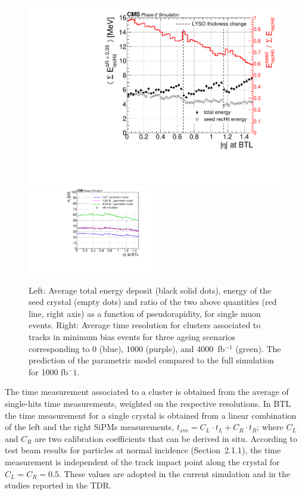 \begin{figure}[hbtp]
\centering
\includegraphics[width=0.49\linewidth]{fig/performance/c_singleMuPtFlat_maxEnergy_vs_eta.pdf}
\includegraphics[width=0.49\textwidth]{fig/performance/c_MinBias_timeRes_vs_eta.pdf}
\caption{Left: Average total energy deposit (black solid dots), energy of the seed crystal (empty dots) and ratio of the two above quantities (red line, right axis) as a function of pseudorapidity, for single muon events. Right: Average time resolution for clusters associated to tracks in minimum bias events for three ageing scenarios corresponding to 0 (blue), 1000 (purple), and 4000~fb$^{-1}$ (green). The prediction of the parametric model compared to the full simulation for 1000 fb$^-1$.
}
\label{fig:BTL_EdepVsEta_timeRes}
\end{figure}



The time measurement associated to a cluster is obtained
from the average of single-hits time measurements, weighted on the
respective resolutions.  In BTL the time measurement for a single crystal is
obtained from a linear combination of the left and the right SiPMs
measurements, $t_{\text{ave}} = C_{L} \cdot t_{L} + C_{R} \cdot t_{R }$; where $C_{L}$
and $C_{R}$ are two calibration coefficients that can be  
derived in situ. According to test beam results for particles at
normal incidence (Section~2.1.1), the time measurement is independent
of the track impact point along the crystal for $C_{L} = C_{R} = 0.5$.  
These values are adopted in the current simulation and in the studies
reported in the TDR.  

